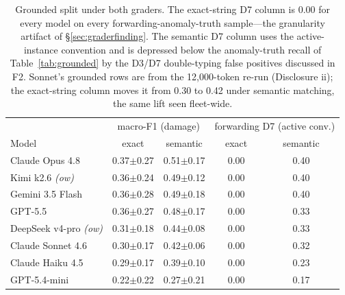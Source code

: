 \documentclass[11pt]{article}
\begin{document}
\begin{table}[h]
\centering\small
\begin{tabular}{@{}lcccc@{}}
\toprule
 & \multicolumn{2}{c}{macro-F1 (damage)} & \multicolumn{2}{c}{forwarding D7 (active conv.)} \\
Model & exact & semantic & exact & semantic \\
\midrule
Claude Opus 4.8       & 0.37$\pm$0.27 & 0.51$\pm$0.17 & 0.00 & 0.40 \\
Kimi k2.6 \emph{(ow)} & 0.36$\pm$0.24 & 0.49$\pm$0.12 & 0.00 & 0.40 \\
Gemini 3.5 Flash      & 0.36$\pm$0.28 & 0.49$\pm$0.18 & 0.00 & 0.40 \\
GPT-5.5               & 0.36$\pm$0.27 & 0.48$\pm$0.17 & 0.00 & 0.33 \\
DeepSeek v4-pro \emph{(ow)} & 0.31$\pm$0.18 & 0.44$\pm$0.08 & 0.00 & 0.33 \\
Claude Sonnet 4.6     & 0.30$\pm$0.17 & 0.42$\pm$0.06 & 0.00 & 0.32 \\
Claude Haiku 4.5      & 0.29$\pm$0.17 & 0.39$\pm$0.10 & 0.00 & 0.23 \\
GPT-5.4-mini          & 0.22$\pm$0.22 & 0.27$\pm$0.21 & 0.00 & 0.17 \\
\bottomrule
\end{tabular}
\caption{Grounded split under both graders. The exact-string D7 column is
0.00 for every model on every forwarding-anomaly-truth sample---the granularity artifact of
\S\ref{sec:graderfinding}. The semantic D7 column uses the
active-instance convention and is depressed below the anomaly-truth
recall of Table~\ref{tab:grounded} by the D3/D7 double-typing false
positives discussed in F2. Sonnet's grounded rows are from the
12{,}000-token re-run (Disclosure ii); the exact-string column moves it
from 0.30 to 0.42 under semantic matching, the same lift seen fleet-wide.
}
\label{tab:exact}
\end{table}
\end{document}
